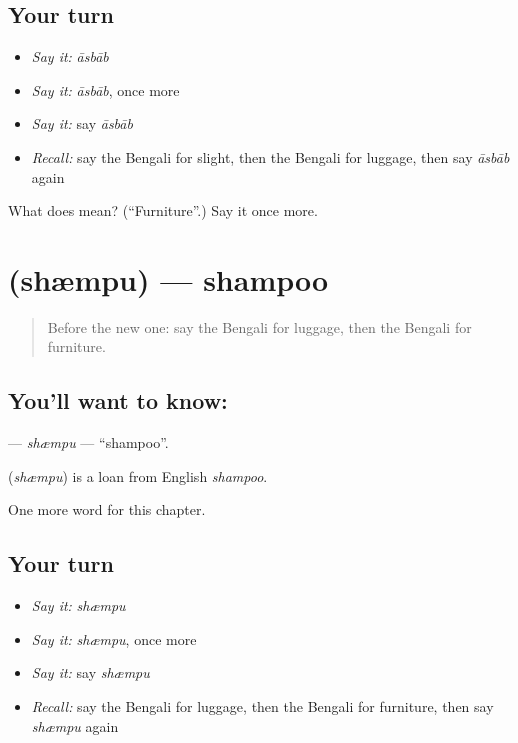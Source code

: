 \subsection*{Your turn}
\begin{itemize}
\raggedright
  \item \emph{Say it:} \emph{āsbāb}
  \item \emph{Say it:} \emph{āsbāb}, once more
  \item \emph{Say it:} say \emph{āsbāb}
  \item \emph{Recall:} say the Bengali for slight, then the Bengali for luggage, then say \emph{āsbāb} again
\end{itemize}

\begin{tcolorbox}[breakable,colback=teal!4,colframe=teal!35!black,title={Before you move on}]
What does  mean? (\textquotedblleft{}Furniture\textquotedblright{}.) Say it once more.
\end{tcolorbox}
\section[\texorpdfstring{\bn{শ্যাম্পু} (shæmpu)}{শ্যাম্পু (shæmpu)}]{ (shæmpu) — shampoo}

\label{lesson:BN-C163-shmpu}



\begin{quote}
Before the new one: say the Bengali for luggage, then the Bengali for furniture.
\end{quote}

\subsection*{You'll want to know: }
\textbf{} — \emph{shæmpu} — \textquotedblleft{}shampoo\textquotedblright{}.

\begin{cousinweb}
\textbf{} (\emph{shæmpu}) is a loan from English \emph{shampoo}.
\end{cousinweb}

\begin{grammarlens}[title={What you've built}]
One more word for this chapter.
\end{grammarlens}

\subsection*{Your turn}
\begin{itemize}
\raggedright
  \item \emph{Say it:} \emph{shæmpu}
  \item \emph{Say it:} \emph{shæmpu}, once more
  \item \emph{Say it:} say \emph{shæmpu}
  \item \emph{Recall:} say the Bengali for luggage, then the Bengali for furniture, then say \emph{shæmpu} again
\end{itemize}

